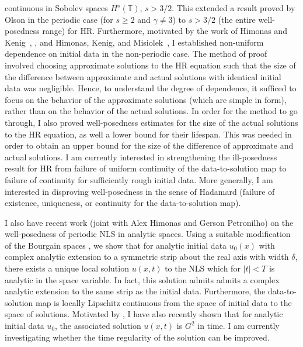 \documentclass[12pt,reqno]{amsart}
\newcommand{\ci}{\mathbb{T}}
\begin{document}
continuous in Sobolev spaces $H^s(\ci)$, $s>3/2$.
This extended a result proved by Olson 
\cite{Olson_2006_Non-uniform-dep} in the periodic
case (for $s\ge 2$ and $\gamma \ne 3$)  to  $s>3/2$ (the entire well-posedness
range) for HR\@. Furthermore, motivated by the work of Himonas and
Kenig~\cite{Himonas:2009fk}, \cite{Himonas:2009fk}, and 
Himonas, Kenig, and Misiolek~\cite{Himonas_2009_Non-uniform-dep-per},
I established non-uniform dependence on initial data
in the non-periodic case.
The method of proof involved choosing
approximate solutions to the HR equation such that the size of the difference between approximate and actual solutions with 
identical initial data was negligible. Hence, to understand the degree of 
dependence, it sufficed to focus on the behavior of the approximate 
solutions (which are simple in form), rather than on the behavior of the 
actual solutions. In order for the method to go through, I also proved 
well-posedness estimates for the size of the 
actual solutions to the HR equation, as well a 
lower bound for their lifespan. This was needed in order to obtain an upper
bound for the size of the difference of approximate and actual solutions. I am
currently interested in strengthening the ill-posedness result for HR from
failure of uniform continuity of the data-to-solution map to failure of
continuity for sufficiently rough initial data. More generally, I am interested
in disproving well-posedness in the sense of Hadamard (failure of existence,
uniqueness, or continuity for the data-to-solution map). 

I also have recent work (joint with Alex Himonas and Gerson Petronilho) on the
well-posedness of periodic NLS in analytic spaces. Using a suitable modification
of the Bourgain spaces \cite{Bourgain-Fourier-transfo}, we show that for analytic initial data $u_{0}(x)$ with
complex analytic extension to a symmetric strip about the real axis with width
$\delta$, there exists a unique local
solution $u(x,t)$ to the NLS which for $| t | < T$
is analytic in the space variable. In fact, this solution admits admits a
complex analytic extension to the same strip as the initial data. Furthermore,
the data-to-solution map is locally Lipschitz continuous from the space of
initial data to the space of solutions. Motivated by
\cite{Gorsky-The-Cauchy-prob}, I have also recently shown that for analytic
initial data $u_{0}$, the associated solution $u(x,t)$ is $G^{2}$ in time. I am
currently investigating whether the time regularity of the solution can be improved. 
\end{document}
